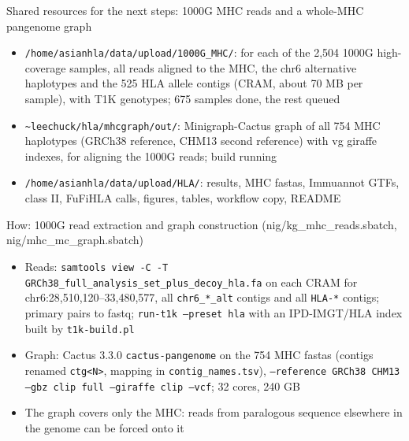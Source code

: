 \documentclass[aspectratio=169,11pt]{beamer}
\begin{document}
\begin{frame}{Shared resources for the next steps: 1000G MHC reads and a whole-MHC pangenome graph}
  \begin{itemize}
    \item \texttt{/home/asianhla/data/upload/1000G\_MHC/}: for each of the 2,504 1000G high-coverage samples, all reads aligned to the MHC, the chr6 alternative haplotypes and the 525 HLA allele contigs (CRAM, about 70 MB per sample), with T1K genotypes; 675 samples done, the rest queued
    \item \texttt{\textasciitilde leechuck/hla/mhcgraph/out/}: Minigraph-Cactus graph of all 754 MHC haplotypes (GRCh38 reference, CHM13 second reference) with vg giraffe indexes, for aligning the 1000G reads; build running
    \item \texttt{/home/asianhla/data/upload/HLA/}: results, MHC fastas, Immuannot GTFs, class II, FuFiHLA calls, figures, tables, workflow copy, README
  \end{itemize}
\end{frame}

\begin{frame}{How: 1000G read extraction and graph construction (nig/kg\_mhc\_reads.sbatch, nig/mhc\_mc\_graph.sbatch)}
  \begin{itemize}
    \item Reads: \texttt{samtools view -C -T GRCh38\_full\_analysis\_set\_plus\_decoy\_hla.fa} on each CRAM for chr6:28,510,120--33,480,577, all \texttt{chr6\_*\_alt} contigs and all \texttt{HLA-*} contigs; primary pairs to fastq; \texttt{run-t1k --preset hla} with an IPD-IMGT/HLA index built by \texttt{t1k-build.pl}
    \item Graph: Cactus 3.3.0 \texttt{cactus-pangenome} on the 754 MHC fastas (contigs renamed \texttt{ctg<N>}, mapping in \texttt{contig\_names.tsv}), \texttt{--reference GRCh38 CHM13 --gbz clip full --giraffe clip --vcf}; 32 cores, 240 GB
    \item The graph covers only the MHC: reads from paralogous sequence elsewhere in the genome can be forced onto it
  \end{itemize}
\end{frame}
\end{document}
